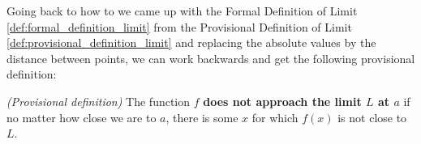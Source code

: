 Going back to how to we came up with the Formal Definition of Limit 	\ref{def:formal_definition_limit}
from the Provisional Definition of Limit \ref{def:provisional_definition_limit} and replacing the absolute values by the distance between points, we can work backwards and get the following provisional definition:\\

\begin{indentPara}
	{\it (Provisional definition)}
	The function $f$ \textbf{does not approach the limit $L$ at $a$} if no matter how close we are to $a$, there is some $x$ for which $f(x)$ is not close to $L$.
\end{indentPara}


%
%


